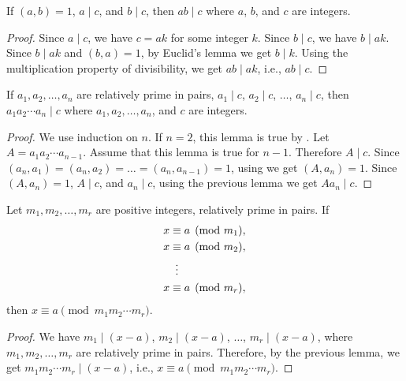 \begin{lemma}
  If \( (a, b) = 1 \), \( a \mid c \), and \( b \mid c \), then \( ab
  \mid c \) where \( a \), \( b \), and \( c \) are integers.
\end{lemma}

\begin{proof}
  Since \( a \mid c \), we have \( c = ak \) for some integer \( k \).
  Since \( b \mid c \), we have \( b \mid ak \). Since \( b \mid ak \)
  and \( (b, a) = 1 \), by Euclid's lemma we get \( b \mid k \). Using
  the multiplication property of divisibility, we get \( ab \mid ak
  \), i.e., \( ab \mid c \).
\end{proof}


\begin{lemma}
  If \( a_1, a_2, \dots, a_n \) are relatively prime in pairs, \( a_1
  \mid c \), \( a_2 \mid c \), \( \dots \), \( a_n \mid c \), then \(
  a_1 a_2 \cdots a_n \mid c \) where \( a_1, a_2, \dots, a_n \), and
  \( c \) are integers.
\end{lemma}

\begin{proof}
  We use induction on \( n \). If \( n = 2 \), this lemma is true by
  . Let \( A = a_1 a_2 \cdots a_{n-1} \).
  Assume that this lemma is true for \( n - 1 \). Therefore \( A \mid
  c \). Since \( (a_n, a_1) = (a_n, a_2) = \dots = (a_n, a_{n-1}) = 1
  \), using  we get \( (A, a_n) = 1 \). Since
  \( (A, a_n) = 1 \), \( A \mid c \), and \( a_n \mid c \), using the
  previous lemma we get \( A a_n \mid c \).
\end{proof}


\begin{lemma}
  Let \( m_1, m_2, \dots, m_r \) are positive integers, relatively
  prime in pairs. If
  \begin{align*}
    x & \equiv a \pmod{m_1}, \\
    x & \equiv a \pmod{m_2}, \\
      & \vdotswithin{\equiv} \\
    x & \equiv a \pmod{m_r}, \\
  \end{align*}
  then \( x \equiv a \pmod{m_1 m_2 \cdots m_r} \).
\end{lemma}

\begin{proof}
  We have \( m_1 \mid (x - a) \), \( m_2 \mid (x - a) \), \( \dots \),
  \( m_r \mid (x - a) \), where \( m_1, m_2, \dots, m_r \) are
  relatively prime in pairs. Therefore, by the previous lemma, we get
  \( m_1 m_2 \cdots m_r \mid (x - a) \), i.e., \( x \equiv a \pmod{m_1
    m_2 \cdots m_r} \).
\end{proof}


